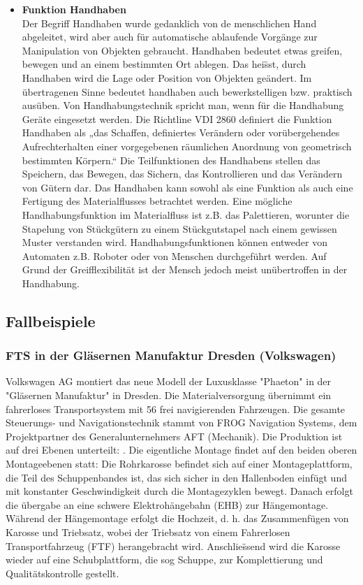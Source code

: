 \begin{itemize}
\item \textbf{Funktion Handhaben } \\
Der Begriff Handhaben wurde gedanklich von de menschlichen Hand abgeleitet, wird aber auch f\"ur automatische ablaufende Vorg\"ange zur Manipulation von Objekten gebraucht. Handhaben bedeutet etwas greifen, bewegen und an einem bestimmten Ort ablegen. Das hei\"sst, durch Handhaben wird die Lage oder Position von Objekten ge\"andert. Im \"ubertragenen Sinne bedeutet handhaben auch bewerkstelligen bzw. praktisch aus\"uben. Von Handhabungstechnik spricht man, wenn f\"ur die Handhabung Ger\"ate eingesetzt werden. 
Die Richtline VDI 2860 definiert die Funktion Handhaben als „das Schaffen, definiertes Ver\"andern oder vor\"ubergehendes Aufrechterhalten einer vorgegebenen r\"aumlichen Anordnung von geometrisch bestimmten K\"orpern.“ Die Teilfunktionen des Handhabens stellen das Speichern, das Bewegen, das Sichern, das Kontrollieren und das Ver\"andern von G\"utern dar. Das Handhaben kann sowohl als eine Funktion als auch eine Fertigung des Materialflusses betrachtet werden. Eine m\"ogliche Handhabungsfunktion im Materialfluss ist z.B. das Palettieren, worunter die Stapelung von St\"uckg\"utern zu einem St\"uckgutstapel nach einem gewissen Muster verstanden wird. Handhabungsfunktionen k\"onnen entweder von Automaten z.B. Roboter oder von Menschen durchgef\"uhrt werden. Auf Grund der Greifflexibilit\"at ist der Mensch jedoch meist un\"ubertroffen in der Handhabung.
\end{itemize}

\subsection{Fallbeispiele}
\subsubsection{FTS in der Gl\"asernen Manufaktur Dresden (Volkswagen)}
Volkswagen AG montiert das neue Modell der Luxusklasse "Phaeton" in der "Gl\"asernen Manufaktur" in Dresden. Die Materialversorgung \"ubernimmt ein fahrerloses Transportsystem mit 56 frei navigierenden Fahrzeugen. Die gesamte Steuerungs- und Navigationstechnik stammt von FROG Navigation Systems, dem Projektpartner des Generalunternehmers AFT (Mechanik).
Die Produktion ist auf drei Ebenen unterteilt: . Die eigentliche Montage findet auf den beiden oberen Montageebenen statt: Die Rohrkarosse befindet sich auf einer Montageplattform, die Teil des Schuppenbandes ist, das sich sicher in den Hallenboden einf\"ugt und mit konstanter Geschwindigkeit durch die Montagezyklen bewegt. Danach erfolgt die \"ubergabe an eine schwere Elektroh\"angebahn (EHB) zur H\"angemontage. W\"ahrend der H\"angemontage erfolgt die Hochzeit, d. h. das Zusammenf\"ugen von Karosse und Triebsatz, wobei der Triebsatz von einem Fahrerlosen Transportfahrzeug (FTF) herangebracht wird. Anschlie\"ssend wird die Karosse wieder auf eine Schubplattform, die sog Schuppe, zur Komplettierung und Qualit\"atskontrolle gestellt.

